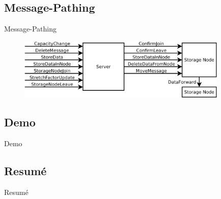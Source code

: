 \documentclass{beamer}
\begin{document}
	\subsection{Message-Pathing}
	\begin{frame}{Message-Pathing}
		\begin{figure}
			\raggedright
			\begin{minipage}{1cm}
				\includegraphics[width=10cm]{messages.png}
			\end{minipage}
		\end{figure}
	\end{frame}
	\subsection{Demo}
	\begin{frame}{Demo}
	\end{frame}
	\subsection{Resumé}
	\begin{frame}{Resumé}
	\end{frame}
	
\end{document}
